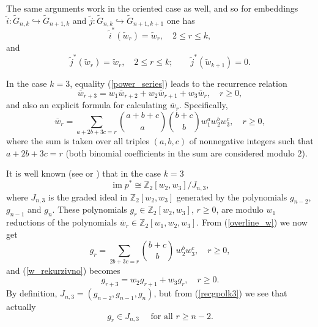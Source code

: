 \documentclass{amsart}
\newcommand{\im}{\operatorname{im}}
\theoremstyle{definition}
\theoremstyle{remark}
\numberwithin{equation}{section}
\begin{document}
The same arguments work in the oriented case as well, and so for embeddings $\widetilde i:\widetilde G_{n,k}\hookrightarrow\widetilde G_{n+1,k}$ and $\widetilde j:\widetilde G_{n,k}\hookrightarrow\widetilde G_{n+1,k+1}$ one has
\begin{equation}\label{naturalityi}
 \widetilde i^*(\widetilde w_r)=\widetilde w_r, \quad 2\le r\le k,  
\end{equation}
and
\begin{equation}\label{naturalityj}
 \widetilde j^*(\widetilde w_r)=\widetilde w_r, \quad 2\le r\le k; \qquad  \widetilde j^*(\widetilde w_{k+1})=0.
\end{equation}

\medskip

In the case $k=3$, equality (\ref{power_series}) leads to the recurrence relation
\begin{equation}\label{w_rekurzivno}
    \overline w_{r+3} = w_1\overline w_{r+2} + w_2\overline w_{r+1} + w_3\overline w_r,\quad r\ge 0,
\end{equation}
and also an explicit formula for calculating $\overline w_r$. Specifically,
\begin{equation}\label{overline_w}
    \overline w_r = \sum_{a+2b+3c = r} \binom{a+b+c}{a}\binom{b+c}{b} w_1^aw_2^bw_3^c,\quad r\ge 0,
\end{equation}
where the sum is taken over all triples $(a,b,c)$ of nonnegative integers such that $a+2b+3c = r$ (both binomial coefficients in the sum are considered modulo $2$).


It is well known (see \cite{Fukaya} or \cite{CP}) that in the case $k=3$
\begin{equation}\label{isomorphism_imp*}
\im p^*\cong\mathbb Z_2[w_2,w_3]/J_{n,3},
\end{equation}
where $J_{n,3}$ is the graded ideal in $\mathbb Z_2[w_2,w_3]$ generated by the polynomials $g_{n-2}$, $g_{n-1}$ and $g_n$. These polynomials $g_r\in\mathbb Z_2[w_2,w_3]$, $r\ge0$, are modulo $w_1$ reductions of the polynomials $\overline w_r\in\mathbb Z_2[w_1,w_2,w_3]$. From (\ref{overline_w}) we now get
\begin{equation}\label{gpolk3}
g_r=\sum_{2b+3c=r}{b+c\choose b}\,w_2^bw_3^c, \quad r\ge0,
\end{equation}
and (\ref{w_rekurzivno}) becomes
\begin{equation}\label{recgpolk3}
g_{r+3}=w_2g_{r+1}+w_3g_r, \quad r\ge0.
\end{equation}
By definition, $J_{n,3}=(g_{n-2},g_{n-1},g_n)$, but from (\ref{recgpolk3}) we see that actually
\begin{equation}\label{r>n-2}
g_r\in J_{n,3} \quad \mbox{ for all } r\ge n-2.
\end{equation}
\end{document}

